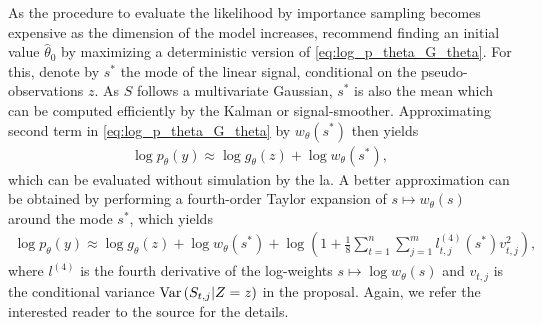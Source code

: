 As the procedure to evaluate the likelihood by importance sampling becomes expensive as the dimension of the model increases, \citep{Durbin1997Monte} recommend finding an initial value $\hat \theta_{0}$ by maximizing a deterministic version of \eqref{eq:log_p_theta_G_theta}. For this, denote by $s^{\ast}$ the mode of the linear signal, conditional on the pseudo-observations $z$. As $S$ follows a multivariate Gaussian, $s^{\ast}$ is also the mean which can be computed efficiently by the Kalman or signal-smoother. Approximating second term in \eqref{eq:log_p_theta_G_theta} by $w_{\theta}(s^{\ast})$ then yields 
\begin{align}
    \label{eq:loglik-initial-approx-mode}
    \log p_{\theta}(y) \approx \log g_{\theta}(z) + \log w_{\theta}(s^{\ast}),
\end{align}
which can be evaluated without simulation by the \gls{la}. A better approximation can be obtained by performing a fourth-order Taylor expansion of $s\mapsto w_{\theta}(s)$ around the mode $s^\ast$, which yields 
\begin{align}
    \label{eq:loglik-initial-tayolor-approx-mode}
    \log p_{\theta}(y) \approx \log g_{\theta}(z) + \log w_{\theta}(s^{\ast}) + \log \left( 1 + \frac{1}{8} \sum_{t = 1}^n\sum_{j = 1}^m l^{(4)}_{t,j}(s^{\ast}) v_{t,j}^2 \right),
\end{align}
where $l^{(4)}$ is the fourth derivative of the log-weights $s\mapsto \log w_{\theta}(s)$ and $v_{t,j}$ is the conditional variance $\operatorname{Var} \left( S_{t,j} | Z = z \right)$ in the proposal. Again, we refer the interested reader to the source for the details.

